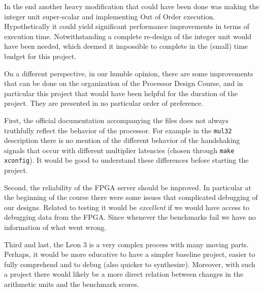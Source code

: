 In the end another heavy modification that could have been done was making the
integer unit super-scalar and implementing Out of Order execution. Hypothetically it could yield 
significant performance improvements in terms of execution time. Notwithstanding a complete re-design of the integer unit
would have been needed, which deemed it impossible to complete in the (small) time budget for this project.


On a different perspective, in our humble opinion, there are some improvements that can be done on the organization of the Processor Design Course, and in particular this project that would have been helpful for the duration of the project. They are presented in no particular order of preference.

First, the official documentation accompanying the files does not always truthfully reflect the behavior of the processor. For example in the \texttt{mul32} description there is no mention of the different behavior of the handshaking signals that occur with different multiplier latencies (chosen through \texttt{make xconfig}). It would be good to understand these differences before starting the project.

Second, the reliability of the FPGA server should be improved. In particular at the beginning of the course there were some issues that complicated debugging of our designs. Related to testing it would be \emph{excellent} if we would have access to debugging data from the FPGA. Since whenever the benchmarks fail we have no information of what went wrong.

Third and last, the Leon 3 is a very complex process with many moving parts. Perhaps, it would be more educative to have a simpler baseline project, easier to fully comprehend and to debug (also quicker to synthesize). Moreover, with such a project there would likely be a more direct relation between changes in the arithmetic units and the benchmark scores.

